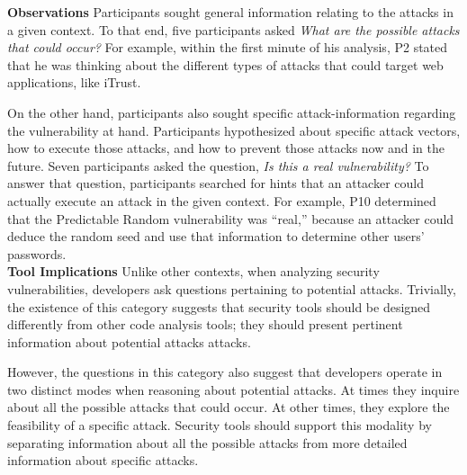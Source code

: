 \documentclass[conference]{IEEEtran}
\begin{document}
\noindent\textbf{Observations}
Participants sought general information relating to the attacks in a given context.
To that end, five participants asked \textit{What are the possible attacks that could occur?}
For example, within the first minute of his analysis, P2 stated that he was thinking about the different types of attacks that could target web applications, like iTrust.

On the other hand, participants also sought specific attack-information regarding the vulnerability at hand.
Participants hypothesized about specific attack vectors, how to execute those attacks, and how to prevent those attacks now and in the future.
Seven participants asked the question, \textit{Is this a real vulnerability?} To answer that question, participants searched for hints that an attacker could actually execute an attack in the given context. For example, P10 determined that the Predictable Random vulnerability was ``real,'' because an attacker could deduce the random seed and use that information to determine other users' passwords. 
\\

\noindent\textbf{Tool Implications}
Unlike other contexts, when analyzing security vulnerabilities, developers ask questions pertaining to potential attacks.
Trivially, the existence of this category suggests that security tools should be designed differently from other code analysis tools; they should present pertinent information about potential attacks attacks.

However, the questions in this category also suggest that developers operate in two distinct modes when reasoning about potential attacks.
At times they inquire about all the possible attacks that could occur.
At other times, they explore the feasibility of a specific attack.
Security tools should support this modality by separating information about all the possible attacks from more detailed information about specific attacks.

\end{document}
